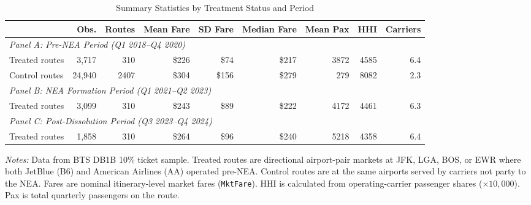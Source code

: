 \begin{table}[H]
\centering
\caption{Summary Statistics by Treatment Status and Period}
\label{tab:summary}
\begin{threeparttable}
\begin{adjustbox}{max width=\textwidth}
\begin{tabular}{lrrrrrrrr}
\toprule
 & Obs. & Routes & Mean Fare & SD Fare & Median Fare & Mean Pax & HHI & Carriers \\
\midrule
\multicolumn{9}{l}{\textit{Panel A: Pre-NEA Period (Q1 2018--Q4 2020)}} \\
Treated routes & 3,717 & 310 & \$226 & \$74 & \$217 & 3872 & 4585 & 6.4 \\
Control routes & 24,940 & 2407 & \$304 & \$156 & \$279 & 279 & 8082 & 2.3 \\
\midrule
\multicolumn{9}{l}{\textit{Panel B: NEA Formation Period (Q1 2021--Q2 2023)}} \\
Treated routes & 3,099 & 310 & \$243 & \$89 & \$222 & 4172 & 4461 & 6.3 \\
\midrule
\multicolumn{9}{l}{\textit{Panel C: Post-Dissolution Period (Q3 2023--Q4 2024)}} \\
Treated routes & 1,858 & 310 & \$264 & \$96 & \$240 & 5218 & 4358 & 6.4 \\
\bottomrule
\end{tabular}
\end{adjustbox}
\par\vspace{0.3em}
{\footnotesize \begin{flushleft}
\textit{Notes:} Data from BTS DB1B 10\% ticket sample. Treated routes are directional airport-pair markets at JFK, LGA, BOS, or EWR where both JetBlue (B6) and American Airlines (AA) operated pre-NEA. Control routes are at the same airports served by carriers not party to the NEA. Fares are nominal itinerary-level market fares (\texttt{MktFare}). HHI is calculated from operating-carrier passenger shares ($\times 10{,}000$). Pax is total quarterly passengers on the route.
\end{flushleft}}
\end{threeparttable}
\end{table}

